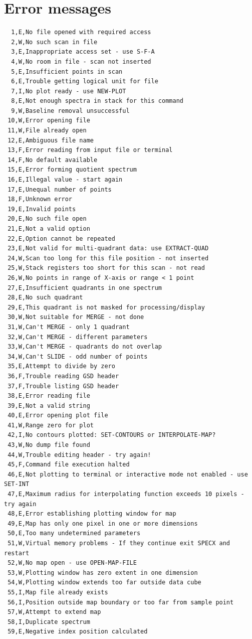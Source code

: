 \documentclass[11pt,twoside]{report}
\begin{document}
\newpage
\chapter{Error messages} 
\begin{verbatim}
  1,E,No file opened with required access
  2,W,No such scan in file
  3,E,Inappropriate access set - use S-F-A
  4,W,No room in file - scan not inserted
  5,E,Insufficient points in scan
  6,E,Trouble getting logical unit for file
  7,I,No plot ready - use NEW-PLOT
  8,E,Not enough spectra in stack for this command
  9,W,Baseline removal unsuccessful
 10,W,Error opening file
 11,W,File already open
 12,E,Ambiguous file name
 13,F,Error reading from input file or terminal
 14,F,No default available
 15,E,Error forming quotient spectrum
 16,E,Illegal value - start again
 17,E,Unequal number of points
 18,F,Unknown error
 19,E,Invalid points
 20,E,No such file open
 21,E,Not a valid option
 22,E,Option cannot be repeated
 23,E,Not valid for multi-quadrant data: use EXTRACT-QUAD
 24,W,Scan too long for this file position - not inserted
 25,W,Stack registers too short for this scan - not read
 26,W,No points in range of X-axis or range < 1 point
 27,E,Insufficient quadrants in one spectrum
 28,E,No such quadrant
 29,E,This quadrant is not masked for processing/display
 30,W,Not suitable for MERGE - not done
 31,W,Can't MERGE - only 1 quadrant
 32,W,Can't MERGE - different parameters
 33,W,Can't MERGE - quadrants do not overlap
 34,W,Can't SLIDE - odd number of points
 35,E,Attempt to divide by zero
 36,F,Trouble reading GSD header
 37,F,Trouble listing GSD header
 38,E,Error reading file
 39,E,Not a valid string
 40,E,Error opening plot file
 41,W,Range zero for plot
 42,I,No contours plotted: SET-CONTOURS or INTERPOLATE-MAP?
 43,W,No dump file found
 44,W,Trouble editing header - try again!
 45,F,Command file execution halted
 46,E,Not plotting to terminal or interactive mode not enabled - use SET-INT
 47,E,Maximum radius for interpolating function exceeds 10 pixels - try again
 48,E,Error establishing plotting window for map
 49,E,Map has only one pixel in one or more dimensions
 50,E,Too many undetermined parameters
 51,W,Virtual memory problems - If they continue exit SPECX and restart
 52,W,No map open - use OPEN-MAP-FILE
 53,W,Plotting window has zero extent in one dimension
 54,W,Plotting window extends too far outside data cube
 55,I,Map file already exists
 56,I,Position outside map boundary or too far from sample point
 57,W,Attempt to extend map
 58,I,Duplicate spectrum
 59,E,Negative index position calculated

\end{verbatim}
\end{document}
